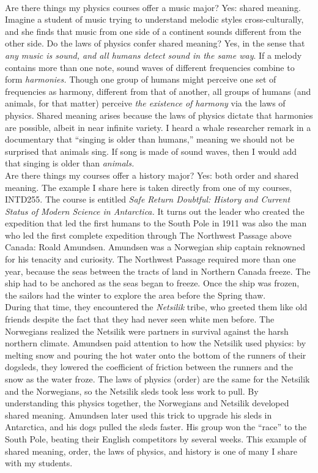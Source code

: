 \documentclass[../../../main.tex]{subfiles}
\begin{document}
\\
\vspace{0.25cm}
Are there things my physics courses offer a music major?  Yes: shared meaning.  Imagine a student of music trying to understand melodic styles cross-culturally, and she finds that music from one side of a continent sounds different from the other side.  Do the laws of physics confer shared meaning?  Yes, in the sense that \textit{any music is sound, and all humans detect sound in the same way}.  If a melody contains more than one note, sound waves of different frequencies combine to form \textit{harmonies.}  Though one group of humans might perceive one set of frequencies as harmony, different from that of another, all groups of humans (and animals, for that matter) perceive \textit{the existence of harmony} via the laws of physics.  Shared meaning arises because the laws of physics dictate that harmonies are possible, albeit in near infinite variety.  I heard a whale researcher remark in a documentary that ``singing is older than humans,'' meaning we should not be surprised that animals sing.  If song is made of sound waves, then I would add that singing is older than \textit{animals.}
\\
\vspace{0.25cm}
Are there things my courses offer a history major?  Yes: both order and shared meaning.  The example I share here is taken directly from one of my courses, INTD255.  The course is entitled \textit{Safe Return Doubtful: History and Current Status of Modern Science in Antarctica.}  It turns out the leader who created the expedition that led the first humans to the South Pole in 1911 was also the man who led the first complete expedition through The Northwest Passage above Canada: Roald Amundsen.  Amundsen was a Norwegian ship captain reknowned for his tenacity and curiosity.  The Northwest Passage required more than one year, because the seas between the tracts of land in Northern Canada freeze.  The ship had to be anchored as the seas began to freeze.  Once the ship was frozen, the sailors had the winter to explore the area before the Spring thaw.
\\
\vspace{0.25cm}
During that time, they encountered the \textit{Netsilik} tribe, who greeted them like old friends despite the fact that they had never seen white men before.  The Norwegians realized the Netsilik were partners in survival against the harsh northern climate. Amundsen paid attention to how the Netsilik used physics: by melting snow and pouring the hot water onto the bottom of the runners of their dogsleds, they lowered the coefficient of friction between the runners and the snow as the water froze.  The laws of physics (order) are the same for the Netsilik and the Norwegians, so the Netsilik sleds took less work to pull.  By understanding this physics together, the Norwegians and Netsilik developed shared meaning.  Amundsen later used this trick to upgrade his sleds in Antarctica, and his dogs pulled the sleds faster.  His group won the ``race'' to the South Pole, beating their English competitors by several weeks.  This example of shared meaning, order, the laws of physics, and history is one of many I share with my students.
\end{document}
